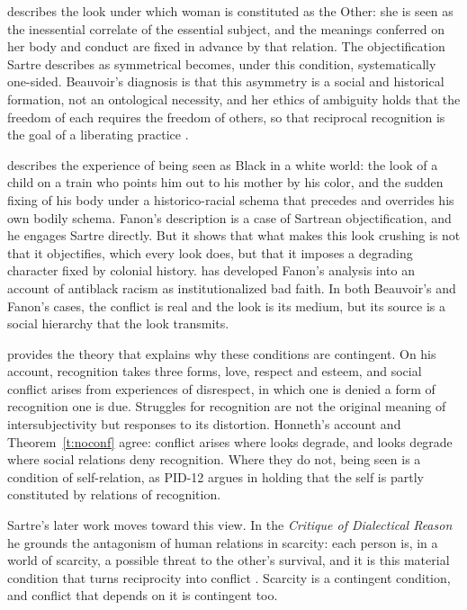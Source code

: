 \documentclass{situationist-preprint}
\begin{document}
\citet{Beauvoir1949} describes the look under which woman is constituted as the Other: she is seen as the inessential correlate of the essential subject, and the meanings conferred on her body and conduct are fixed in advance by that relation. The objectification Sartre describes as symmetrical becomes, under this condition, systematically one-sided. Beauvoir's diagnosis is that this asymmetry is a social and historical formation, not an ontological necessity, and her ethics of ambiguity holds that the freedom of each requires the freedom of others, so that reciprocal recognition is the goal of a liberating practice \citep{Beauvoir1947}.

\citet{Fanon1952} describes the experience of being seen as Black in a white world: the look of a child on a train who points him out to his mother by his color, and the sudden fixing of his body under a historico-racial schema that precedes and overrides his own bodily schema. Fanon's description is a case of Sartrean objectification, and he engages Sartre directly. But it shows that what makes this look crushing is not that it objectifies, which every look does, but that it imposes a degrading character fixed by colonial history. \citet{Gordon1995} has developed Fanon's analysis into an account of antiblack racism as institutionalized bad faith. In both Beauvoir's and Fanon's cases, the conflict is real and the look is its medium, but its source is a social hierarchy that the look transmits.

\citet{Honneth1992} provides the theory that explains why these conditions are contingent. On his account, recognition takes three forms, love, respect and esteem, and social conflict arises from experiences of disrespect, in which one is denied a form of recognition one is due. Struggles for recognition are not the original meaning of intersubjectivity but responses to its distortion. Honneth's account and Theorem~\ref{t:noconf} agree: conflict arises where looks degrade, and looks degrade where social relations deny recognition. Where they do not, being seen is a condition of self-relation, as PID-12 argues in holding that the self is partly constituted by relations of recognition.

Sartre's later work moves toward this view. In the \emph{Critique of Dialectical Reason} he grounds the antagonism of human relations in scarcity: each person is, in a world of scarcity, a possible threat to the other's survival, and it is this material condition that turns reciprocity into conflict \citep{Sartre1960}. Scarcity is a contingent condition, and conflict that depends on it is contingent too.
\end{document}
